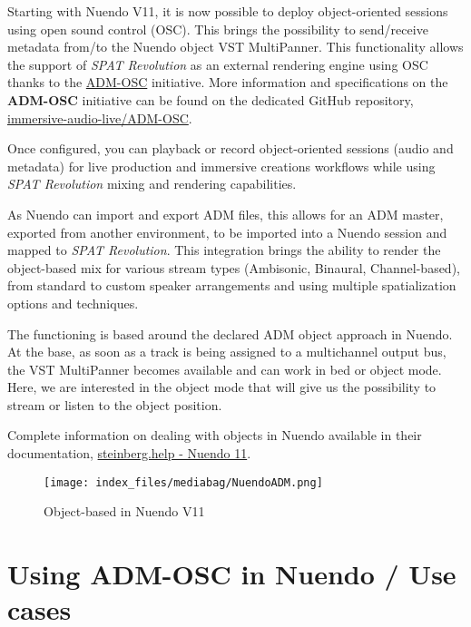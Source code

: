 \documentclass[
  letterpaper,
  DIV=11,
  numbers=noendperiod]{scrreport}
\begin{document}
Starting with Nuendo V11, it is now possible to deploy object-oriented
sessions using open sound control (OSC). This brings the possibility to
send/receive metadata from/to the Nuendo object VST MultiPanner. This
functionality allows the support of \emph{SPAT Revolution} as an
external rendering engine using OSC thanks to the
\href{Ecosystem_\&_integration_ADM_OSC.md}{ADM-OSC} initiative. More
information and specifications on the \textbf{ADM-OSC} initiative can be
found on the dedicated GitHub repository,
\href{https://github.com/immersive-audio-live/ADM-OSC}{immersive-audio-live/ADM-OSC}.

Once configured, you can playback or record object-oriented sessions
(audio and metadata) for live production and immersive creations
workflows while using \emph{SPAT Revolution} mixing and rendering
capabilities.

As Nuendo can import and export ADM files, this allows for an ADM
master, exported from another environment, to be imported into a Nuendo
session and mapped to \emph{SPAT Revolution}. This integration brings
the ability to render the object-based mix for various stream types
(Ambisonic, Binaural, Channel-based), from standard to custom speaker
arrangements and using multiple spatialization options and techniques.

The functioning is based around the declared ADM object approach in
Nuendo. At the base, as soon as a track is being assigned to a
multichannel output bus, the VST MultiPanner becomes available and can
work in bed or object mode. Here, we are interested in the object mode
that will give us the possibility to stream or listen to the object
position.

Complete information on dealing with objects in Nuendo available in
their documentation,
\href{https://www.steinberg.help/nuendo-manuals/nuendo/nuendo-11/}{steinberg.help
- Nuendo 11}.

\begin{figure}

{\centering \texttt{[image: index\_files/mediabag/NuendoADM.png]}

}

\caption{Object-based in Nuendo V11}

\end{figure}

\hypertarget{using-adm-osc-in-nuendo-use-cases}{%
\section{Using ADM-OSC in Nuendo / Use
cases}\label{using-adm-osc-in-nuendo-use-cases}}
\end{document}

